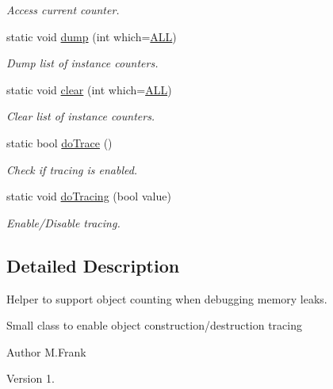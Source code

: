 \begin{DoxyCompactItemize}
\begin{DoxyCompactList}\small\item\em Access current counter. \end{DoxyCompactList}\item 
static void \hyperlink{struct_d_d4hep_1_1_instance_count_ae9cc6db5c9117d6451a3d817c55af8c1}{dump} (int which=\hyperlink{struct_d_d4hep_1_1_instance_count_ae1ac289e30ac5ae83640ae2ed97f947ca948324c1e49c9a310b45c9f681b381a8}{A\+LL})
\begin{DoxyCompactList}\small\item\em Dump list of instance counters. \end{DoxyCompactList}\item 
static void \hyperlink{struct_d_d4hep_1_1_instance_count_a94bb311b134800236d5be147df616072}{clear} (int which=\hyperlink{struct_d_d4hep_1_1_instance_count_ae1ac289e30ac5ae83640ae2ed97f947ca948324c1e49c9a310b45c9f681b381a8}{A\+LL})
\begin{DoxyCompactList}\small\item\em Clear list of instance counters. \end{DoxyCompactList}\item 
static bool \hyperlink{struct_d_d4hep_1_1_instance_count_afa4f90d11074c40ba3bde59bb5c59785}{do\+Trace} ()
\begin{DoxyCompactList}\small\item\em Check if tracing is enabled. \end{DoxyCompactList}\item 
static void \hyperlink{struct_d_d4hep_1_1_instance_count_a12dd0a7dd1f4a64ef784dec2eda4b96a}{do\+Tracing} (bool value)
\begin{DoxyCompactList}\small\item\em Enable/\+Disable tracing. \end{DoxyCompactList}\end{DoxyCompactItemize}


\subsection{Detailed Description}
Helper to support object counting when debugging memory leaks. 

Small class to enable object construction/destruction tracing

\begin{DoxyAuthor}{Author}
M.\+Frank 
\end{DoxyAuthor}
\begin{DoxyVersion}{Version}
1. 
\end{DoxyVersion}


